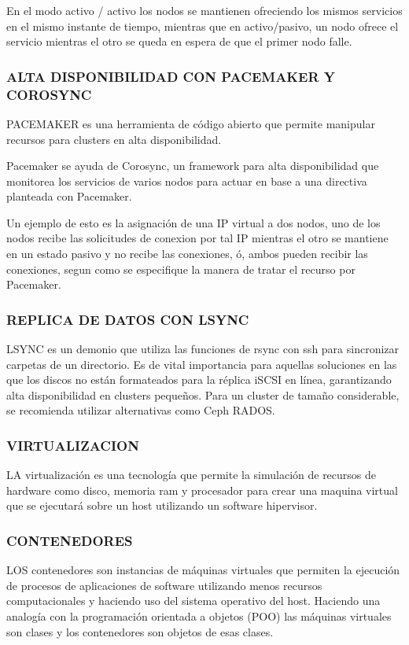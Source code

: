  	En el modo activo / activo los nodos se mantienen ofreciendo los mismos servicios en el mismo instante de tiempo, mientras que en activo/pasivo, un nodo ofrece el servicio mientras el otro se queda en espera de que el primer nodo falle.
    
    \subsubsection{ALTA DISPONIBILIDAD CON PACEMAKER Y COROSYNC}
	    
    PACEMAKER es una herramienta de código abierto que permite manipular recursos para clusters en alta disponibilidad.
    
    Pacemaker se ayuda de Corosync, un framework para alta disponibilidad que monitorea los servicios de varios nodos para actuar en base a una directiva planteada con Pacemaker.
    
    Un ejemplo de esto es la asignación de una IP virtual a dos nodos, uno de los nodos recibe las solicitudes de conexion por tal  IP mientras el otro se mantiene en un estado pasivo y no recibe las conexiones, ó, ambos pueden recibir las conexiones, segun como se especifique la manera de tratar el recurso por Pacemaker.
    
    \subsubsection{REPLICA DE DATOS CON LSYNC}
    
    LSYNC es un demonio que utiliza las funciones de rsync con ssh para sincronizar carpetas de un directorio. Es de vital importancia para aquellas soluciones en las que los discos no están formateados para la réplica iSCSI en línea, garantizando alta disponibilidad en clusters pequeños. Para un cluster de tamaño considerable, se recomienda utilizar alternativas como Ceph RADOS.
    
	\subsubsection{VIRTUALIZACION}     
   	LA virtualización es una tecnología que permite la simulación de recursos de hardware como disco, memoria ram y procesador para crear una maquina virtual que se ejecutará sobre un host utilizando un software hipervisor.
        
    \subsubsection{CONTENEDORES}
    LOS contenedores son instancias de máquinas virtuales que permiten la ejecución de procesos de aplicaciones de software utilizando menos recursos computacionales y haciendo uso del sistema operativo del host. Haciendo una analogía con la programación orientada a objetos (POO) las máquinas virtuales son clases y los contenedores son objetos de esas clases.
    
